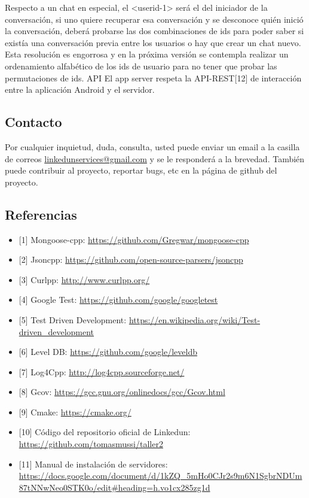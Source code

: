\documentclass[a4paper,10pt,spanish]{sphinxmanual}
\begin{document}
Respecto a un chat en especial, el \textless{}userid-1\textgreater{} será el del iniciador de la conversación, si uno quiere recuperar esa conversación y se desconoce quién inició la conversación, deberá probarse las dos combinaciones de ids para poder saber si existía una conversación previa entre los usuarios o hay que crear un chat nuevo. Esta resolución es engorrosa y en la próxima versión se contempla realizar un ordenamiento alfabético de los ids de usuario para no tener que probar las permutaciones de ids.
API
El app server respeta la API-REST{[}12{]} de interacción entre la aplicación Android y el servidor.


\subsection{Contacto}
\label{docTecnica:contacto}
Por cualquier inquietud, duda, consulta, usted puede enviar un email a la casilla de correos \href{mailto:linkedunservices@gmail.com}{linkedunservices@gmail.com} y se le responderá a la brevedad.
También puede contribuir al proyecto, reportar bugs, etc en la página de github del proyecto.


\subsection{Referencias}
\label{docTecnica:referencias}\begin{itemize}
\item {} 
{[}1{]} Mongoose-cpp: \url{https://github.com/Gregwar/mongoose-cpp}

\item {} 
{[}2{]} Jsoncpp: \url{https://github.com/open-source-parsers/jsoncpp}

\item {} 
{[}3{]} Curlpp: \url{http://www.curlpp.org/}

\item {} 
{[}4{]} Google Test: \url{https://github.com/google/googletest}

\item {} 
{[}5{]} Test Driven Development: \url{https://en.wikipedia.org/wiki/Test-driven\_development}

\item {} 
{[}6{]} Level DB: \url{https://github.com/google/leveldb}

\item {} 
{[}7{]} Log4Cpp: \url{http://log4cpp.sourceforge.net/}

\item {} 
{[}8{]} Gcov: \url{https://gcc.gnu.org/onlinedocs/gcc/Gcov.html}

\item {} 
{[}9{]} Cmake: \url{https://cmake.org/}

\item {} 
{[}10{]} Código del repositorio oficial de Linkedun: \url{https://github.com/tomasmussi/taller2}

\item {} 
{[}11{]} Manual de instalación de servidores: \url{https://docs.google.com/document/d/1kZQ\_5mHo0CJr2s9m6N1SgbrNDUm87tNNwNeo0STK0o/edit\#heading=h.vo1cx285zg1d}

\end{itemize}
\end{document}
